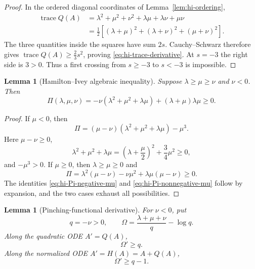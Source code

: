 \documentclass[10pt]{coll-l}
\newcommand{\trace}{\operatorname{trace}}
\newtheorem{lemma}[theorem]{Lemma}
\theoremstyle{definition}
\theoremstyle{remark}
\numberwithin{section}{chapter}
\numberwithin{equation}{chapter}
\begin{document}
\begin{proof}
In the ordered diagonal coordinates of
Lemma~\ref{lem:hi-ordering},
\begin{align}
 \trace Q(A)
 &=\lambda^2+\mu^2+\nu^2+\lambda\mu+\lambda\nu+\mu\nu\\
 &=\frac12\left[
     (\lambda+\mu)^2+(\lambda+\nu)^2+(\mu+\nu)^2
   \right].                                               \label{eq:hi-trace-Q}
\end{align}
The three quantities inside the squares have sum $2s$.  Cauchy--Schwarz
therefore gives $\trace Q(A)\geq\frac23s^2$, proving
\eqref{eq:hi-trace-derivative}.  At $s=-3$ the right side is $3>0$.
Thus a first crossing from $s\geq-3$ to $s<-3$ is impossible.
\end{proof}

\begin{lemma}[Hamilton--Ivey algebraic inequality]
\label{lem:hi-algebra}
Suppose $\lambda\geq\mu\geq\nu$ and $\nu<0$.  Then
\begin{equation}
 \Pi(\lambda,\mu,\nu)
   =
   -\nu(\lambda^2+\mu^2+\lambda\mu)
     +(\lambda+\mu)\lambda\mu
   \geq0.                                                  \label{eq:hi-Pi}
\end{equation}
\end{lemma}

\begin{proof}
If $\mu<0$, then
\begin{equation}
 \Pi
  =(\mu-\nu)(\lambda^2+\mu^2+\lambda\mu)-\mu^3.            \label{eq:hi-Pi-negative-mu}
\end{equation}
Here $\mu-\nu\geq0$,
\[
 \lambda^2+\mu^2+\lambda\mu
   =\left(\lambda+\frac{\mu}{2}\right)^2+\frac34\mu^2
   \geq0,
\]
and $-\mu^3>0$.  If $\mu\geq0$, then $\lambda\geq\mu\geq0$
and
\begin{equation}
 \Pi
   =\lambda^2(\mu-\nu)-\nu\mu^2
      +\lambda\mu(\mu-\nu)\geq0.                          \label{eq:hi-Pi-nonnegative-mu}
\end{equation}
The identities \eqref{eq:hi-Pi-negative-mu} and
\eqref{eq:hi-Pi-nonnegative-mu} follow by expansion, and the two cases
exhaust all possibilities.
\end{proof}

\begin{lemma}[Pinching-functional derivative]
\label{lem:hi-pinching-derivative}
For $\nu<0$, put
\begin{equation}
 q=-\nu>0,\qquad
 \Omega=\frac{\lambda+\mu+\nu}{q}-\log q.                 \label{eq:hi-Omega}
\end{equation}
Along the quadratic ODE $A'=Q(A)$,
\begin{equation}
                  \Omega'\geq q.                          \label{eq:hi-Omega-Q}
\end{equation}
Along the normalized ODE $A'=H(A)=A+Q(A)$,
\begin{equation}
                  \Omega'\geq q-1.                        \label{eq:hi-Omega-H}
\end{equation}
\end{lemma}
\end{document}

